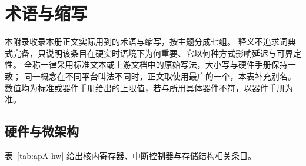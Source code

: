 \documentclass[12pt,a4paper,fontset=fandol]{ctexbook}
\begin{document}
\appendix

\chapter{术语与缩写}

\label{ap:apA-glossary}

本附录收录本册正文实际用到的术语与缩写，按主题分成七组。
释义不追求词典式完备，只说明该条目在硬实时语境下为何重要、它以何种方式影响延迟与可界定性。
全称一律采用标准文本或上游文档中的原始写法，大小写与硬件手册保持一致；
同一概念在不同平台叫法不同时，正文取使用最广的一个，本表补充别名。
数值均为标准或器件手册给出的上限值，若与所用具体器件不符，以器件手册为准。

\section{硬件与微架构}

表~\ref{tab:apA-hw} 给出核内寄存器、中断控制器与存储结构相关条目。
\end{document}
